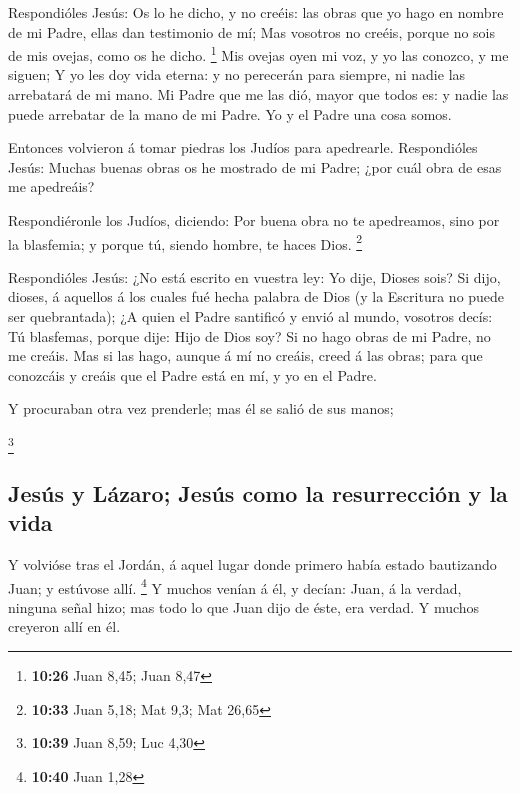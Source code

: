  Respondióles Jesús: Os lo he dicho, y no creéis: las obras
que yo hago en nombre de mi Padre, ellas dan testimonio de mí;
 Mas vosotros no creéis, porque no sois de mis ovejas, como
os he dicho. \footnote{\textbf{10:26} Juan 8,45; Juan 8,47}
 Mis ovejas oyen mi voz, y yo las conozco, y me siguen;
 Y yo les doy vida eterna: y no perecerán para siempre, ni
nadie las arrebatará de mi mano.  Mi Padre que me las dió,
mayor que todos es: y nadie las puede arrebatar de la mano de mi Padre.
 Yo y el Padre una cosa somos.

 Entonces volvieron á tomar piedras los Judíos para
apedrearle.  Respondióles Jesús: Muchas buenas obras os he
mostrado de mi Padre; ¿por cuál obra de esas me apedreáis?

 Respondiéronle los Judíos, diciendo: Por buena obra no te
apedreamos, sino por la blasfemia; y porque tú, siendo hombre, te haces
Dios. \footnote{\textbf{10:33} Juan 5,18; Mat 9,3; Mat 26,65}

 Respondióles Jesús: ¿No está escrito en vuestra ley: Yo
dije, Dioses sois?  Si dijo, dioses, á aquellos á los
cuales fué hecha palabra de Dios (y la Escritura no puede ser
quebrantada);  ¿A quien el Padre santificó y envió al
mundo, vosotros decís: Tú blasfemas, porque dije: Hijo de Dios soy?
 Si no hago obras de mi Padre, no me creáis. 
Mas si las hago, aunque á mí no creáis, creed á las obras; para que
conozcáis y creáis que el Padre está en mí, y yo en el Padre.

 Y procuraban otra vez prenderle; mas él se salió de sus
manos;

\footnote{\textbf{10:39} Juan 8,59; Luc 4,30}

\hypertarget{jesuxfas-y-luxe1zaro-jesuxfas-como-la-resurrecciuxf3n-y-la-vida}{%
\subsection{Jesús y Lázaro; Jesús como la resurrección y la
vida}\label{jesuxfas-y-luxe1zaro-jesuxfas-como-la-resurrecciuxf3n-y-la-vida}}

 Y volvióse tras el Jordán, á aquel lugar donde primero
había estado bautizando Juan; y estúvose allí. \footnote{\textbf{10:40}
  Juan 1,28}  Y muchos venían á él, y decían: Juan, á la
verdad, ninguna señal hizo; mas todo lo que Juan dijo de éste, era
verdad.  Y muchos creyeron allí en él.

